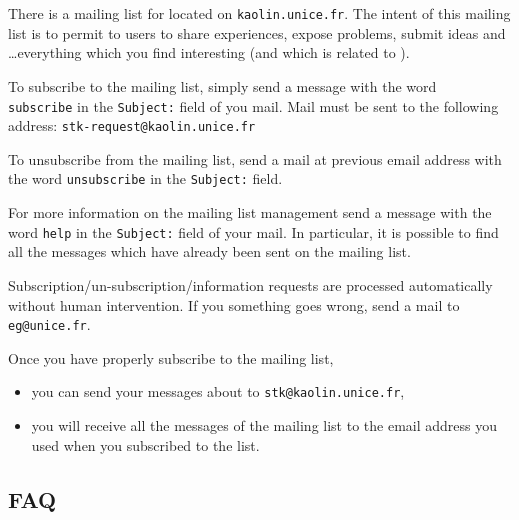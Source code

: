 There is a mailing list for {\stk} located on {\tt kaolin.unice.fr}.  The
intent of this mailing list is to permit to {\stk} users to share experiences,
expose problems, submit ideas and \ldots everything which you find interesting
(and which is related to \stk).

To subscribe to the mailing list, simply send a message with the word {\tt
subscribe} in the {\tt Subject:} field of you mail.  Mail must be sent to the
following address: {\tt stk-request@kaolin.unice.fr}

To unsubscribe from the mailing list, send a mail at previous email address with the word {\tt unsubscribe} in the {\tt Subject:} field.

For more information on the mailing list management send a message with the
word {\tt help} in the {\tt Subject:} field of your mail. In particular, it
is possible to find all the messages which have already been sent on the {\stk} 
mailing list.

Subscription/un-subscription/information requests are processed
automatically without human intervention. If you something goes wrong, send a
mail to {\tt eg@unice.fr}.

Once you have properly subscribe to the mailing list, 
\begin{itemize}
\item you can send your messages about {\stk} to {\tt stk@kaolin.unice.fr},
\item you will receive all the messages of the mailing list to the email 
address you used when you subscribed to the list.
\end{itemize}

\subsection{{\stk} FAQ}


